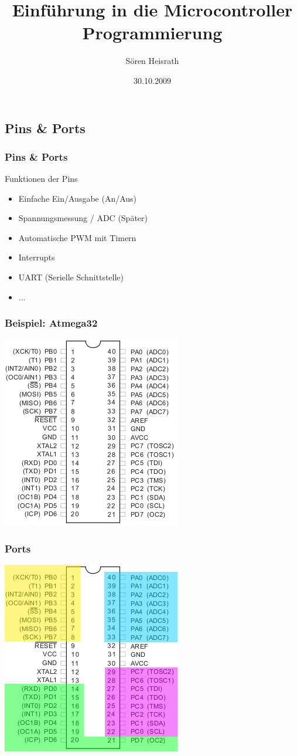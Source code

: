 \documentclass{beamer}
\title{Einf\"uhrung in die Microcontroller Programmierung}
\author{S\"oren Heisrath}
\date{30.10.2009}
\begin{document}
\frame{\titlepage}

\section[Grundfunktionen des Microcontrollers]{}

\subsection{Pins \& Ports}
\frame
{
	\frametitle{Pins \& Ports}
	Funktionen der Pins
	\begin{itemize}
		\item Einfache Ein/Ausgabe (An/Aus)
		\item Spannungsmessung / ADC (Sp\"ater)
		\item Automatische PWM mit Timern
		\item Interrupts
		\item UART (Serielle Schnittstelle)
		\item ...
	\end{itemize}

}
\frame
{
	\frametitle{Beispiel: Atmega32}
	\includegraphics[scale=0.6]{img/ioports}
}

\frame
{
	\frametitle{Ports}
	\includegraphics[scale=0.6]{img/ioports_hl}
}
\end{document}
